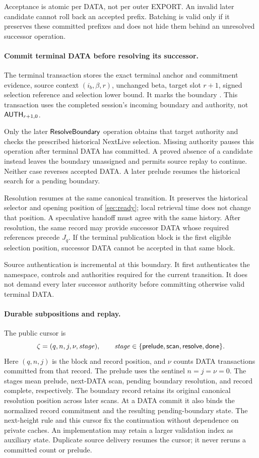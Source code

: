 Acceptance is atomic per DATA, not per outer EXPORT. An invalid later
candidate cannot roll back an accepted prefix. Batching is valid only
if it preserves these committed prefixes and does not hide them behind
an unresolved successor operation.

\paragraph{Commit terminal DATA before resolving its successor.}
\label{sec:terminal-commit}
The terminal transaction stores the exact terminal anchor and commitment
evidence, source context $(i_b,\beta,r)$, unchanged beta, target slot
$r+1$, signed selection reference and selection lower bound.
It marks the boundary .
This transaction uses the completed session's incoming boundary and
authority, not $\mathsf{AUTH}_{r+1,0}$.

Only the later $\mathsf{ResolveBoundary}$ operation obtains that target
authority and checks the prescribed historical NextLive selection.
Missing authority pauses this operation after terminal DATA has committed.
A proved absence of a candidate instead leaves the boundary unassigned
and permits source replay to continue. Neither case reverses accepted
DATA. A later prelude resumes the historical search for a pending boundary.

Resolution resumes at the same canonical transition. It preserves the
historical selector and opening position of \cref{sec:ready}; local
retrieval time does not change that position. A speculative handoff
must agree with the same history. After resolution, the same record
may provide successor DATA whose required references precede $J_q$.
If the terminal publication block is the first eligible selection
position, successor DATA cannot be accepted in that same block.

Source authentication is incremental at this boundary. It first
authenticates the namespace, controls and authorities required for the
current transition. It does not demand every later successor authority
before committing otherwise valid terminal DATA.

\paragraph{Durable subpositions and replay.}
\label{sec:subpositions}
The public cursor is
\[
 \zeta=(q,n,j,\nu,\mathit{stage}),\qquad
 \mathit{stage}\in\{\mathsf{prelude},\mathsf{scan},\mathsf{resolve},\mathsf{done}\}.
\]
Here $(q,n,j)$ is the block and record position, and $\nu$ counts DATA
transactions committed from that record. The prelude uses the sentinel
$n=j=\nu=0$. The stages mean prelude, next-DATA scan, pending boundary
resolution, and record complete, respectively. The boundary record
retains its original canonical resolution position across later scans.
At a DATA commit it also binds the normalized record commitment and
the resulting pending-boundary state. The next-height rule and this
cursor fix the continuation without dependence on private caches.
An implementation may retain a larger validation index as auxiliary
state. Duplicate source delivery resumes the cursor; it never reruns
a committed count or prelude.

